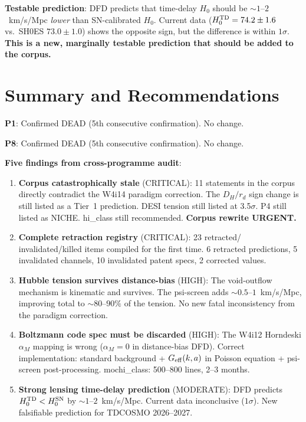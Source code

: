 \documentclass[11pt]{article}
\newcommand{\Geff}{G_{\rm eff}}
\begin{document}
\textbf{Testable prediction}: DFD predicts that time-delay $H_0$ should
be $\sim 1$--$2$~km/s/Mpc \emph{lower} than SN-calibrated $H_0$.
Current data ($H_0^{\rm TD} = 74.2 \pm 1.6$ vs.\ SH0ES $73.0 \pm 1.0$)
shows the opposite sign, but the difference is within $1\sigma$.
\textbf{This is a new, marginally testable prediction that should be
added to the corpus.}


\part{Summary and Recommendations}

\begin{tcolorbox}[colback=green!5!white, colframe=green!60!black,
  title=\textbf{W4i15 Summary}]

\textbf{P1}: Confirmed DEAD (5th consecutive confirmation). No change.

\textbf{P8}: Confirmed DEAD (5th consecutive confirmation). No change.

\textbf{Five findings from cross-programme audit}:

\begin{enumerate}[nosep]
\item \textbf{Corpus catastrophically stale} (CRITICAL): 11 statements
  in the corpus directly contradict the W4i14 paradigm correction.
  The $D_H/r_d$ sign change is still listed as a Tier~1 prediction.
  DESI tension still listed at 3.5$\sigma$.  P4 still listed as NICHE.
  hi\_class still recommended.  \textbf{Corpus rewrite URGENT.}

\item \textbf{Complete retraction registry} (CRITICAL): 23 retracted/
  invalidated/killed items compiled for the first time.  6 retracted
  predictions, 5 invalidated channels, 10 invalidated patent specs,
  2 corrected values.

\item \textbf{Hubble tension survives distance-bias} (HIGH): The
  void-outflow mechanism is kinematic and survives.  The psi-screen
  adds $\sim 0.5$--$1$~km/s/Mpc, improving total to $\sim 80$--$90\%$
  of the tension.  No new fatal inconsistency from the paradigm
  correction.

\item \textbf{Boltzmann code spec must be discarded} (HIGH): The W4i12
  Horndeski $\alpha_M$ mapping is wrong ($\alpha_M = 0$ in
  distance-bias DFD).  Correct implementation: standard background +
  $\Geff(k,a)$ in Poisson equation + psi-screen post-processing.
  mochi\_class: 500--800 lines, 2--3 months.

\item \textbf{Strong lensing time-delay prediction} (MODERATE): DFD
  predicts $H_0^{\rm TD} < H_0^{\rm SN}$ by $\sim 1$--$2$~km/s/Mpc.
  Current data inconclusive ($1\sigma$).  New falsifiable prediction
  for TDCOSMO 2026--2027.

\end{enumerate}

\end{tcolorbox}
\end{document}
